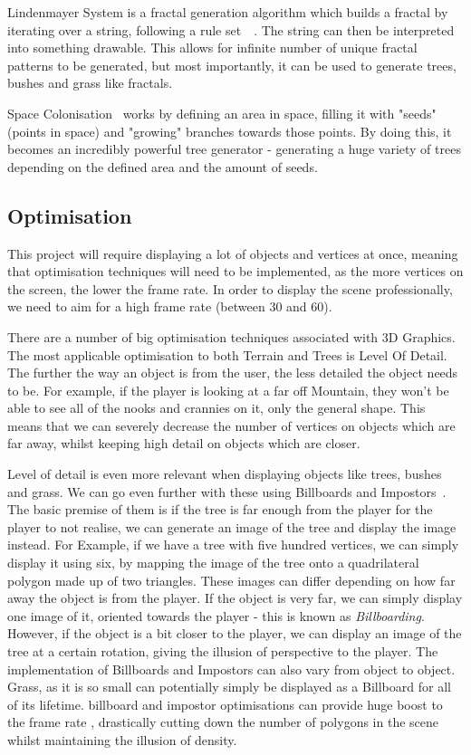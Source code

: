 \documentclass[a4paper,10pt]{report}
\begin{document}
Lindenmayer System is a fractal generation algorithm which builds a fractal by iterating over a string, following a rule set~\cite{prusinkiewicz2012algorithmic}~\cite{crownover1995introduction}. The string can then be interpreted into something drawable. This allows for infinite number of unique fractal patterns to be generated, but most importantly, it can be used to generate trees, bushes and grass like fractals.  

Space Colonisation~\cite{runions2007modeling} works by defining an area in space, filling it with "seeds" (points in space) and "growing" branches towards those points. By doing this, it becomes an incredibly powerful tree generator - generating a huge variety of trees depending on the defined area and the amount of seeds.

\subsection{Optimisation}
This project will require displaying a lot of objects and vertices at once, meaning that optimisation techniques will need to be implemented, as the more vertices on the screen, the lower the frame rate. In order to display the scene professionally, we need to aim for a high frame rate (between 30 and 60).  \medskip

There are a number of big optimisation techniques associated with 3D Graphics. The most applicable optimisation to both Terrain and Trees is Level Of Detail. The further the way an object is from the user, the less detailed the object needs to be. For example, if the player is looking at a far off Mountain, they won't be able to see all of the nooks and crannies on it, only the general shape. This means that we can severely decrease the number of vertices on objects which are far away, whilst keeping high detail on objects which are closer. \medskip

Level of detail is even more relevant when displaying objects like trees, bushes and grass. We can go even further with these using Billboards and Impostors~\cite{jia2013fast}. The basic premise of them is if the tree is far enough from the player for the player to not realise, we can generate an image of the tree and display the image instead. For Example, if we have a tree with five hundred vertices, we can simply display it using six, by mapping the image of the tree onto a quadrilateral polygon made up of two triangles. These images can differ depending on how far away the object is from the player. If the object is very far, we can simply display one image of it, oriented towards the player - this is known as \textit{Billboarding}. However, if the object is a bit closer to the player, we can display an image of the tree at a certain rotation, giving the illusion of perspective to the player. The implementation of Billboards and Impostors can also vary from object to object. Grass, as it is so small can potentially simply be displayed as a Billboard for all of its lifetime. billboard and impostor optimisations can provide huge boost to the frame rate , drastically cutting down the number of polygons in the scene whilst maintaining the illusion of density. \medskip
\end{document}
